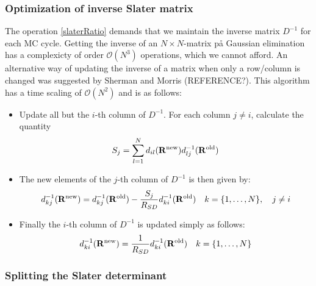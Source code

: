 \documentclass[english, a4paper]{article}
\begin{document}
\noindent 

\subsubsection{Optimization of inverse Slater matrix}
\noindent The operation \eqref{slaterRatio} demands that we maintain the inverse matrix $D^{-1}$ for each
MC cycle. Getting the inverse of an $N\times N$-matrix på Gaussian elimination has a complexicty of order
$\mathcal{O}(N^3)$ operations, which we cannot afford. An alternative way of updating the inverse
of a matrix when only a row/column is changed was suggested by Sherman and Morris (REFERENCE?). 
This algorithm has a time scaling
of $\mathcal{O}(N^2)$ and is as follows:
\begin{itemize}
 \item Update all but the $i$-th column of $D^{-1}$. For each column $j\neq i$,
 calculate the quantity 
 $$S_j = \sum_{l=1}^N d_{il} ({\bf R}^{\textrm{new}}) d_{lj}^{-1} ({\bf R}^{\textrm{old}})$$
 \item The new elements of the $j$-th column of $D^{-1}$ is then given by: 
 $$d_{kj}^{-1}({\bf R}^{\textrm{new}}) = d_{kj}^{-1}({\bf R}^{\textrm{old}}) - \frac{S_j}{R_{SD}}
 d_{ki}^{-1}({\bf R}^{\textrm{old}}) \quad k = \{1,\dots,N\}, \quad j \neq i$$
 \item Finally the $i$-th column of $D^{-1}$ is updated simply as follows:
 $$d_{ki}^{-1}({\bf R}^{\textrm{new}}) = \frac{1}{R_{SD}} d_{ki}^{-1}({\bf R}^{\textrm{old}}) \quad
 k = \{1,\dots,N\}$$
\end{itemize}

\subsubsection{Splitting the Slater determinant}
\end{document}
